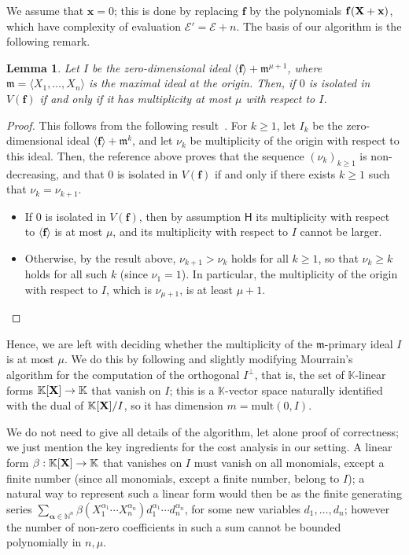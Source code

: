 \documentclass[11pt]{article}
\numberwithin{Property}{section}
\numberwithin{Theorem}{section}
\numberwithin{Proposition}{section}
\newtheorem{Lemma}{Lemma}%
\numberwithin{Lemma}{section}
\numberwithin{Corollary}{section}
\numberwithin{Definition}{section}
\numberwithin{Remark}{section}
\numberwithin{Conjecture}{section}
\numberwithin{Problem}{section}
\numberwithin{Claim}{section}
\theoremstyle{definition}
\numberwithin{Example}{section}
\renewcommand{\ge}{\geqslant}
\renewcommand{\ge}{\geqslant} %
\newcommand{\field}{\mathbb{K}} %
\newcommand{\mat}[1]{\mathbf{\MakeUppercase{#1}}} %
\begin{document}
We assume that $\mathbf{x} = 0$; this is done by replacing $\mathbf{f}$ by the polynomials $\mathbf{f}(\mat{X}+\mathbf{x})$, which have complexity of evaluation $\mathcal{E}'= \mathcal{E}+n$.  The basis of our algorithm is the following remark.
\begin{Lemma}
Let $I$ be the zero-dimensional ideal $\langle \mathbf{f} \rangle + \mathfrak{m} ^{\mu+1}$, where $\mathfrak{m} = \langle X_1,\dots,X_n\rangle$ is the maximal ideal at the origin. Then, if $0$ is isolated in $V(\mathbf{f})$ if and only if it has multiplicity at most $\mu$ with respect to $I$.
\end{Lemma}
\begin{proof}
This follows from the following result~\cite[Theorem~A.1]{BaHaPeSo09}.  For $k \ge 1$, let $I_k$ be the zero-dimensional ideal $\langle \mathbf{f} \rangle + \mathfrak{m}^{k}$, and let $\nu_k$ be multiplicity of the origin with respect to this ideal. Then, the reference above proves that the sequence $(\nu_k)_{k \ge 1}$ is non-decreasing, and that $0$ is isolated in $V(\mathbf{f})$ if and only if there exists $k\ge 1$ such that $\nu_k=\nu_{k+1}$.
\begin{itemize}
\item If $0$ is isolated in $V(\mathbf{f})$, then by assumption $\mathsf{H}$  its multiplicity with respect to $\langle \mathbf{f} \rangle$ is at most $\mu$, and its multiplicity with respect to $I$ cannot be larger.
\item Otherwise, by the result above, $\nu_{k+1} > \nu_k$ holds for all $k \ge 1$, so that $\nu_k \ge k$ holds for all such $k$ (since $\nu_1=1$). In particular, the multiplicity of the origin with respect to $I$, which is $\nu_{\mu+1}$, is at least $\mu+1$.
    \qedhere
  \end{itemize}
\end{proof}

Hence, we are left with deciding whether the multiplicity of the $\mathfrak{m}$-primary ideal $I$ is at most $\mu$. We do this by following and slightly modifying Mourrain's algorithm for the computation of the orthogonal $I^{\perp}$, that is, the set of $\field$-linear forms $\field[\mat{X}] \to \field$ that vanish on $I$; this is a $\field$-vector space naturally identified with the dual of $\field[\mat{X}]/I$, so it has dimension $m = \mathrm{mult}(0,I)$. 

We do not need to give all details of the algorithm, let alone proof of correctness; we just mention the key ingredients for the cost analysis in our setting. A linear form $\beta: \field[\mat{X}] \to \field$ that vanishes on $I$ must vanish on all monomials, except a finite number (since all monomials, except a finite number, belong to $I$); a natural way to represent such a linear form would then be as the finite generating series $\sum_{\mathbf{\alpha} \in \mathbb{N}^n}\beta(X_1^{\alpha_1}\cdots X_n^{\alpha_n}) d_1^{\alpha_1}\cdots d_n^{\alpha_n}$, for some new variables $d_1,\dots,d_n$; however the number of non-zero coefficients in such a sum cannot be bounded polynomially in $n,\mu$.
\end{document}
